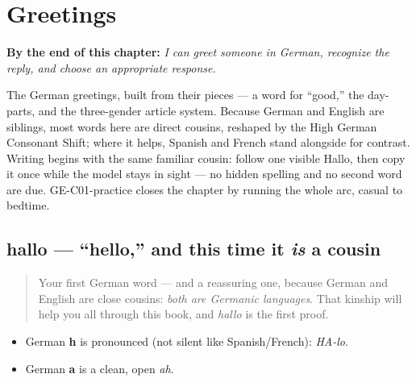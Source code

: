 
\chapter{Greetings}
\label{ch:greetings}

\begin{chapteropening}
\textbf{By the end of this chapter:} \emph{I can greet someone in German, recognize the reply, and choose an appropriate response.}

The German greetings, built from their pieces — a word for \textquotedblleft{}good,\textquotedblright{} the day-parts, and the three-gender article system. Because German and English are siblings, most words here are direct cousins, reshaped by the High German Consonant Shift; where it helps, Spanish and French stand alongside for contrast. Writing begins with the same familiar cousin: follow one visible Hallo, then copy it once while the model stays in sight — no hidden spelling and no second word are due. GE-C01-practice closes the chapter by running the whole arc, casual to bedtime.
\end{chapteropening}

\section[hallo]{hallo — \textquotedblleft{}hello,\textquotedblright{} and this time it \emph{is} a cousin}

\label{lesson:GE-C01-hallo}



\begin{quote}
Your first German word — and a reassuring one, because German and English are close cousins: \emph{both are Germanic languages}. That kinship will help you all through this book, and \emph{hallo} is the first proof.
\end{quote}

\begin{sounds}
\begin{itemize}
\raggedright
  \item German \textbf{h} is pronounced (not silent like Spanish/French): \emph{HA-lo}.
  \item German \textbf{a} is a clean, open \emph{ah}.
\end{itemize}
\end{sounds}


